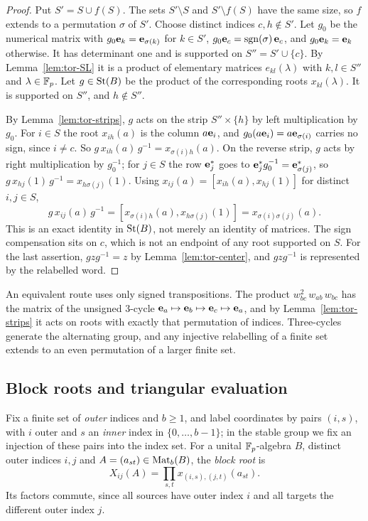 \begin{proof}
Put $S'=S\cup f(S)$. The sets $S'\setminus S$ and $S'\setminus f(S)$ have the same size, so $f$ extends to a
permutation $\sigma$ of $S'$. Choose distinct indices $c,h\notin S'$. Let $g_0$ be the numerical matrix with
$g_0\mathbf e_k=\mathbf e_{\sigma(k)}$ for $k\in S'$, $g_0\mathbf e_c=\operatorname{sgn}(\sigma)\,\mathbf e_c$, and $g_0\mathbf e_k=\mathbf e_k$
otherwise. It has determinant one and is supported on $S''=S'\cup\{c\}$. By Lemma~\ref{lem:tor-SL} it is a product of
elementary matrices $e_{kl}(\lambda)$ with $k,l\in S''$ and $\lambda\in\mathbb F_p$. Let $g\in\operatorname{St}(B)$ be the product of the
corresponding roots $x_{kl}(\lambda)$. It is supported on $S''$, and $h\notin S''$.

By Lemma~\ref{lem:tor-strips}, $g$ acts on the strip $S''\times\{h\}$ by left multiplication by $g_0$. For $i\in S$ the
root $x_{ih}(a)$ is the column $a\mathbf e_i$, and $g_0(a\mathbf e_i)=a\mathbf e_{\sigma(i)}$ carries no sign, since $i\neq c$.
So $g\,x_{ih}(a)\,g^{-1}=x_{\sigma(i)h}(a)$. On the reverse strip, $g$ acts by right multiplication by $g_0^{-1}$; for
$j\in S$ the row $\mathbf e_j^*$ goes to $\mathbf e_j^*g_0^{-1}=\mathbf e_{\sigma(j)}^*$, so
$g\,x_{hj}(1)\,g^{-1}=x_{h\sigma(j)}(1)$. Using $x_{ij}(a)=[x_{ih}(a),x_{hj}(1)]$ for distinct $i,j\in S$,
\[
 g\,x_{ij}(a)\,g^{-1}=[x_{\sigma(i)h}(a),x_{h\sigma(j)}(1)]=x_{\sigma(i)\sigma(j)}(a).
\]
This is an exact identity in $\operatorname{St}(B)$, not merely an identity of matrices. The sign compensation sits on $c$, which is
not an endpoint of any root supported on $S$. For the last assertion, $gzg^{-1}=z$ by Lemma~\ref{lem:tor-center}, and
$gzg^{-1}$ is represented by the relabelled word.
\end{proof}

An equivalent route uses only signed transpositions. The product $w_{bc}^2\,w_{ab}\,w_{bc}$ has the matrix of the
unsigned $3$-cycle $\mathbf e_a\mapsto\mathbf e_b\mapsto\mathbf e_c\mapsto\mathbf e_a$, and by Lemma~\ref{lem:tor-strips} it acts on
roots with exactly that permutation of indices. Three-cycles generate the alternating group, and any injective relabelling
of a finite set extends to an even permutation of a larger finite set.

\subsection{Block roots and triangular evaluation}

Fix a finite set of \emph{outer} indices and $b\geq1$, and label coordinates by pairs $(i,s)$, with $i$ outer and $s$
an \emph{inner} index in $\{0,\dots,b-1\}$; in the stable group we fix an injection of these pairs into the index set.
For a unital $\mathbb F_p$-algebra $B$, distinct outer indices $i,j$ and $A=(a_{st})\in\operatorname{Mat}_b(B)$, the \emph{block root} is
\[
 X_{ij}(A)=\prod_{s,t}x_{(i,s),(j,t)}(a_{st}).
\]
Its factors commute, since all sources have outer index $i$ and all targets the different outer index $j$.

